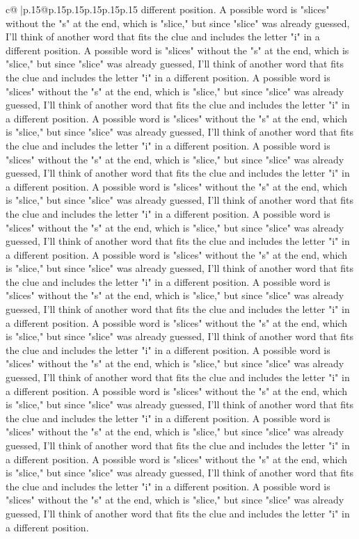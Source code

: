 \documentclass{article}
\begin{document}
{\begin{supertabular}{c@{$\;$}|p{.15\linewidth}@{}p{.15\linewidth}p{.15\linewidth}p{.15\linewidth}p{.15\linewidth}p{.15\linewidth}}
{{{different position. A possible word is "slices" without the "s" at the end, which is "slice," but since "slice" was already guessed, I'll think of another word that fits the clue and includes the letter "i" in a different position. A possible word is "slices" without the "s" at the end, which is "slice," but since "slice" was already guessed, I'll think of another word that fits the clue and includes the letter "i" in a different position. A possible word is "slices" without the "s" at the end, which is "slice," but since "slice" was already guessed, I'll think of another word that fits the clue and includes the letter "i" in a different position. A possible word is "slices" without the "s" at the end, which is "slice," but since "slice" was already guessed, I'll think of another word that fits the clue and includes the letter "i" in a different position. A possible word is "slices" without the "s" at the end, which is "slice," but since "slice" was already guessed, I'll think of another word that fits the clue and includes the letter "i" in a different position. A possible word is "slices" without the "s" at the end, which is "slice," but since "slice" was already guessed, I'll think of another word that fits the clue and includes the letter "i" in a different position. A possible word is "slices" without the "s" at the end, which is "slice," but since "slice" was already guessed, I'll think of another word that fits the clue and includes the letter "i" in a different position. A possible word is "slices" without the "s" at the end, which is "slice," but since "slice" was already guessed, I'll think of another word that fits the clue and includes the letter "i" in a different position. A possible word is "slices" without the "s" at the end, which is "slice," but since "slice" was already guessed, I'll think of another word that fits the clue and includes the letter "i" in a different position. A possible word is "slices" without the "s" at the end, which is "slice," but since "slice" was already guessed, I'll think of another word that fits the clue and includes the letter "i" in a different position. A possible word is "slices" without the "s" at the end, which is "slice," but since "slice" was already guessed, I'll think of another word that fits the clue and includes the letter "i" in a different position. A possible word is "slices" without the "s" at the end, which is "slice," but since "slice" was already guessed, I'll think of another word that fits the clue and includes the letter "i" in a different position. A possible word is "slices" without the "s" at the end, which is "slice," but since "slice" was already guessed, I'll think of another word that fits the clue and includes the letter "i" in a different position. A possible word is "slices" without the "s" at the end, which is "slice," but since "slice" was already guessed, I'll think of another word that fits the clue and includes the letter "i" in a different position. A possible word is "slices" without the "s" at the end, which is "slice," but since "slice" was already guessed, I'll think of another word that fits the clue and includes the letter "i" in a different position. }}}
\end{supertabular}}
\end{document}
